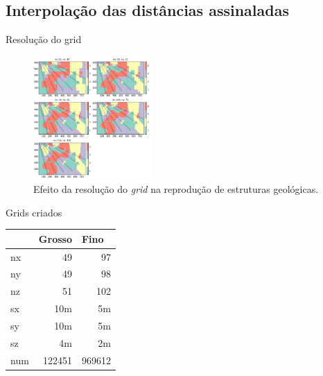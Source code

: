 \documentclass[aspectratio=169]{beamer}
\begin{document}
\subsection{Interpolação das distâncias assinaladas}

\begin{frame}{Resolução do grid}

\begin{figure}[H]
	\caption{\label{grid_res}Efeito da resolução do \textit{grid} na reprodução de estruturas geológicas.}
	\begin{center}
		\includegraphics[width=0.4\textwidth]{capitulo_2/grid_res.png}
	\end{center}
\end{figure}

\end{frame}

\begin{frame}{Grids criados}
	\begin{table}[H]
		\centering
		\begin{tabular}{lrr}
			& \multicolumn{1}{l}{Grosso} & \multicolumn{1}{l}{Fino} \\ \hline
			nx & 49 & 97 \\
			ny & 49 & 98 \\
			nz & 51 & 102 \\
			sx & 10m & 5m \\
			sy & 10m & 5m \\
			sz & 4m & 2m \\
			num & 122451 & 969612 \\ \hline
		\end{tabular}
	\end{table}
\end{frame}
\end{document}
